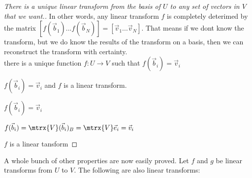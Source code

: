\begin{proof}[There is a unique linear transform from the basis of $U$ to any set of vectors in $V$ that we want.] In other words, any linear transform $f$ is completely deterimed by the matrix $[ f(\vec{b}_1) ... f(\vec{b}_N) ] = [\vec{v}_1 ... \vec{v}_N]$. That means if we dont know the transform, but we do know the results of the transform on a basis, then we can reconstruct the transform with certainty.  \\

    { there is a unique function $f:U \to V$ such that $f(\vec{b}_i) = \vec{v}_i$ }{
    
        {$f(\vec{b}_i) = \vec{v}_i$ and $f$ is a linear transform.}{
        
            {$f(\vec{b}_i) = \vec{v}_i$}{
                
                $ f(\vec{b}_i) = \mtrx{V} (\vec{b}_i)_B = \mtrx{V} \vec{e}_i = \vec{v}_i $
                
            }
            
            
            {$f$ is a linear tansform}{
            
            }
        }
    }
\end{proof}

A whole bunch of other properties are now easily proved. Let $f$ and $g$ be linear transforms from $U$ to $V$. The following are also linear transforms: 


